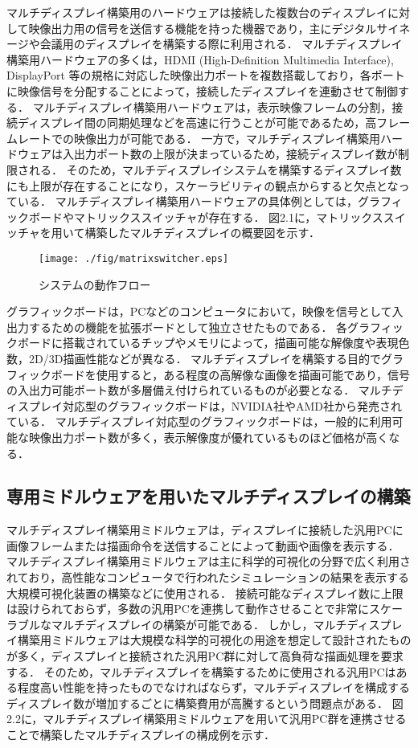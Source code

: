 \documentclass[12pt,a4paper]{jbook}
\begin{document}
マルチディスプレイ構築用のハードウェアは接続した複数台のディスプレイに対して映像出力用の信号を送信する機能を持った機器であり，主にデジタルサイネージ\cite{signage}や会議用のディスプレイを構築する際に利用される．
マルチディスプレイ構築用ハードウェアの多くは，HDMI (High-Definition Multimedia Interface), DisplayPort \cite{displayport}等の規格に対応した映像出力ポートを複数搭載しており，各ポートに映像信号を分配することによって，接続したディスプレイを連動させて制御する．
マルチディスプレイ構築用ハードウェアは，表示映像フレームの分割，接続ディスプレイ間の同期処理などを高速に行うことが可能であるため，高フレームレートでの映像出力が可能である．
一方で，マルチディスプレイ構築用ハードウェアは入出力ポート数の上限が決まっているため，接続ディスプレイ数が制限される．
そのため，マルチディスプレイシステムを構築するディスプレイ数にも上限が存在することになり，スケーラビリティの観点からすると欠点となっている．
マルチディスプレイ構築用ハードウェアの具体例としては，グラフィックボードやマトリックススイッチャが存在する．
図2.1に，マトリックススイッチャを用いて構築したマルチディスプレイの概要図を示す．

\begin{figure}[htbp]
 \texttt{[image: ./fig/matrixswitcher.eps]}
 \caption{システムの動作フロー}
 \label{fig.1}
\end{figure}

グラフィックボードは，PCなどのコンピュータにおいて，映像を信号として入出力するための機能を拡張ボードとして独立させたものである．
各グラフィックボードに搭載されているチップやメモリによって，描画可能な解像度や表現色数，2D/3D描画性能などが異なる．
マルチディスプレイを構築する目的でグラフィックボードを使用すると，ある程度の高解像な画像を描画可能であり，信号の入出力可能ポート数が多層備え付けられているものが必要となる．
マルチディスプレイ対応型のグラフィックボードは，NVIDIA社やAMD社から発売されている．
マルチディスプレイ対応型のグラフィックボードは，一般的に利用可能な映像出力ポート数が多く，表示解像度が優れているものほど価格が高くなる．

\subsection{専用ミドルウェアを用いたマルチディスプレイの構築}

マルチディスプレイ構築用ミドルウェアは，ディスプレイに接続した汎用PCに画像フレームまたは描画命令を送信することによって動画や画像を表示する．
マルチディスプレイ構築用ミドルウェアは主に科学的可視化の分野で広く利用されており，高性能なコンピュータで行われたシミュレーションの結果を表示する大規模可視化装置の構築などに使用される．
接続可能なディスプレイ数に上限は設けられておらず，多数の汎用PCを連携して動作させることで非常にスケーラブルなマルチディスプレイの構築が可能である．
しかし，マルチディスプレイ構築用ミドルウェアは大規模な科学的可視化の用途を想定して設計されたものが多く，ディスプレイと接続された汎用PC群に対して高負荷な描画処理を要求する．
そのため，マルチディスプレイを構築するために使用される汎用PCはある程度高い性能を持ったものでなければならず，マルチディスプレイを構成するディスプレイ数が増加するごとに構築費用が高騰するという問題点がある．
図2.2に，マルチディスプレイ構築用ミドルウェアを用いて汎用PC群を連携させることで構築したマルチディスプレイの構成例を示す．
\end{document}
